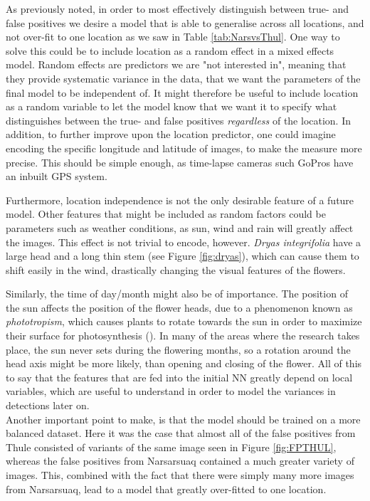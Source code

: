 \documentclass[12pt]{article}
\begin{document}
As previously noted, in order to most effectively distinguish between true- and false positives we desire a model that is able to generalise across all locations, and not over-fit to one location as we saw in Table \ref{tab:NarsvsThul}. One way to solve this could be to include location as a random effect in a mixed effects model. Random effects are predictors we are "not interested in", meaning that they provide systematic variance in the data, that we want the parameters of the final model to be independent of. It might therefore be useful to include location as a random variable to let the model know that we want it to specify what distinguishes between the true- and false positives \textit{regardless} of the location.  
In addition, to further improve upon the location predictor, one could imagine encoding the specific longitude and latitude of images, to make the measure more precise. This should be simple enough, as time-lapse cameras such GoPros have an inbuilt GPS system.

Furthermore, location independence is not the only desirable feature of a future model. Other features that might be included as random factors could be parameters such as weather conditions, as sun, wind and rain will greatly affect the images. This effect is not trivial to encode, however. \textit{Dryas integrifolia} have a large head and a long thin stem (see Figure \ref{fig:dryas}), which can cause them to shift easily in the wind, drastically changing the visual features of the flowers. 

Similarly, the time of day/month might also be of importance. The position of the sun affects the position of the flower heads, due to a phenomenon known as \textit{phototropism}, which causes plants to rotate towards the sun in order to maximize their surface for photosynthesis (\cite{evertRavenBiologyPlants2012}). In many of the areas where the research takes place, the sun never sets during the flowering months, so a rotation around the head axis might be more likely, than opening and closing of the flower. All of this to say that the features that are fed into the initial NN greatly depend on local variables, which are useful to understand in order to model the variances in detections later on.\\

Another important point to make, is that the model should be trained on a more balanced dataset. Here it was the case that almost all of the false positives from Thule consisted of variants of the same image seen in Figure \ref{fig:FPTHUL}, whereas the false positives from Narsarsuaq contained a much greater variety of images. This, combined with the fact that there were simply many more images from Narsarsuaq, lead to a model that greatly over-fitted to one location.\\
\end{document}
